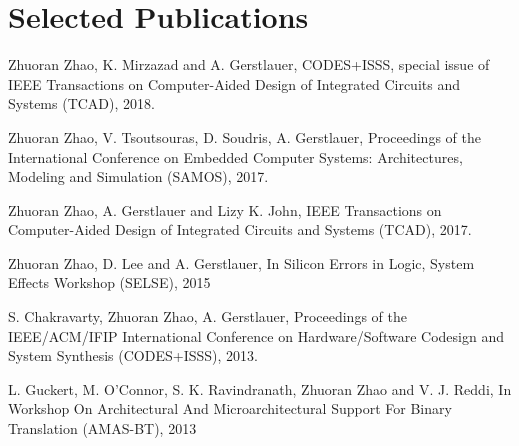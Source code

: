 \documentclass[letterpaper,11pt]{article}
\begin{document}
\section{Selected Publications}
\begin{enumerate}[label={[\arabic*]}, leftmargin=*]

  \item \label{DeepThings} {{Zhuoran Zhao}, K. Mirzazad and A. Gerstlauer,  
    {CODES+ISSS, special issue of IEEE Transactions on Computer-Aided Design of Integrated Circuits and Systems (TCAD), 2018.} \vspace{-3pt}}
  \item \label{NoSSim} {{Zhuoran Zhao}, V. Tsoutsouras, D. Soudris, A. Gerstlauer,  
    {Proceedings of the International Conference on Embedded Computer Systems: Architectures, Modeling and Simulation (SAMOS), 2017.} \vspace{-3pt}}
  \item \label{PERPT} {{Zhuoran Zhao}, A. Gerstlauer and Lizy K. John,  
    {IEEE Transactions on Computer-Aided Design of Integrated Circuits and Systems (TCAD), 2017.} \vspace{-3pt}}
  \item \label{Web} {Zhuoran Zhao, D. Lee and A. Gerstlauer,  
    {In Silicon Errors in Logic, System Effects Workshop (SELSE), 2015} \vspace{-3pt}}
  \item \label{RBA} {S. Chakravarty, { Zhuoran Zhao}, A. Gerstlauer,  
    {Proceedings of the IEEE/ACM/IFIP International Conference on Hardware/Software Codesign and System Synthesis (CODES+ISSS), 2013.} \vspace{-3pt}}
  \item \label{Web} {L. Guckert, M. O'Connor, S. K. Ravindranath, { Zhuoran Zhao} and V. J. Reddi,  
    {In Workshop On Architectural And Microarchitectural Support For Binary Translation (AMAS-BT), 2013} \vspace{-3pt}}



\end{enumerate}
\end{document}
